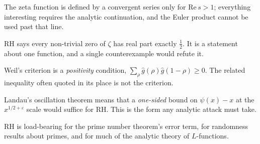 \begin{keytakeaways}

\item The zeta function is defined by a convergent series only for
$\mathrm{Re}\,  s > 1$; everything interesting requires the analytic continuation, and the
Euler product cannot be used past that line.
\item RH says every non-trivial zero of $\zeta$ has real part exactly
$\tfrac12$. It is a statement about one function, and a single counterexample
would refute it.
\item Weil's criterion is a \emph{positivity} condition,
$\sum_\rho \hat g(\rho)\hat g(1-\rho) \ge 0$. The related inequality often
quoted in its place is not the criterion.
\item Landau's oscillation theorem means that a \emph{one-sided} bound on
$\psi(x)-x$ at the $x^{1/2+\varepsilon}$ scale would suffice for RH. This is
the form any analytic attack must take.
\item RH is load-bearing for the prime number theorem's error term, for
randomness results about primes, and for much of the analytic theory of
$L$-functions.
\end{keytakeaways}
